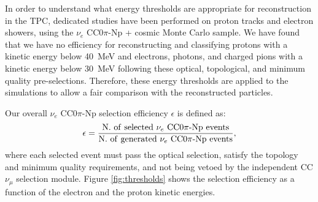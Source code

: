 In order to understand what energy thresholds are appropriate for reconstruction in the TPC, dedicated studies have been performed on proton tracks and electron showers, using the $\nu_{e}$ CC$0\pi$-Np + cosmic Monte Carlo sample. We have found that we have no efficiency for reconstructing and classifying protons {with a kinetic energy} below 40~MeV and electrons{, photons, and charged pions} {with a kinetic energy} below 30~MeV following these optical, topological, and minimum quality pre-selections. Therefore, these energy thresholds are applied to the simulations to allow a fair comparison with the reconstructed particles. 

Our overall $\nu_{e}$ CC$0\pi$-Np selection efficiency $\epsilon$ is defined as:
\begin{equation}
\epsilon = \frac{\mathrm{N.~of~selected~}\nu_{e}\mathrm{~CC0}\pi\mathrm{{\text -}Np~events}}{\mathrm{N.~of~generated~}\nu_{e}\mathrm{~CC0}\pi\mathrm{{\text -}Np~events}},
\end{equation}
where each selected event must pass the optical selection, satisfy the topology and minimum quality requirements, and not being vetoed by the independent CC $\nu_{\mu}$ selection module. Figure \ref{fig:thresholds} shows the selection efficiency as a function of the electron and the proton kinetic energies. 

